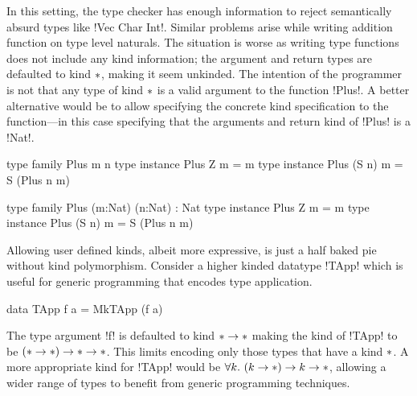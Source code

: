 \documentclass[manuscript,screen,nonacm]{acmart}
\begin{document}
In this setting, the type checker has enough information to reject semantically absurd types like !Vec Char Int!.
Similar problems arise while writing addition function on type level naturals. The situation is worse as writing type functions does not include any kind information; the argument and return types are defaulted to kind $\ast$, making it seem unkinded. The intention of the programmer is not that any type of kind $\ast$ is a valid argument to the function !Plus!. A better alternative would be to allow specifying the concrete kind specification to the function---in this case specifying that the arguments and return kind of !Plus! is a !Nat!.

\begin{minipage}[ht]{0.4\linewidth}
  \begin{code}
    type family Plus m n
    type instance Plus Z m     = m
    type instance Plus (S n) m = S (Plus n m)
  \end{code}
\end{minipage}
\begin{minipage}[ht]{0.4\linewidth}
  \begin{code}
    type family Plus (m:Nat) (n:Nat) : Nat
    type instance Plus Z m     = m
    type instance Plus (S n) m = S (Plus n m)
  \end{code}
\end{minipage}

Allowing user defined kinds, albeit more expressive, is just a half baked pie without kind polymorphism. Consider a higher kinded datatype !TApp! which is useful for generic programming that encodes type application.
\begin{code}
  data TApp f a = MkTApp (f a)
\end{code}

The type argument !f! is defaulted to kind $\ast \to \ast$ making the kind of !TApp! to be $(\ast \to \ast) \to \ast \to \ast$. This limits encoding only those types that have a kind $\ast$. A more appropriate kind for !TApp! would be $\forall k.~(k\to\ast) \to k \to \ast$, allowing a wider range of types to benefit from generic programming techniques.
\end{document}
